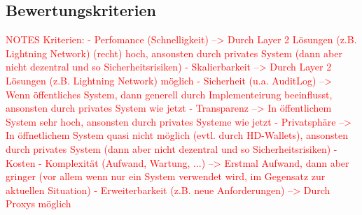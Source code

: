 \noindent

\subsection{Bewertungskriterien}

\begin{flushleft}

    \textcolor{red}{NOTES Kriterien: \break
    - Perfomance (Schnelligkeit) --> Durch Layer 2 Lösungen (z.B. Lightning Network) (recht) hoch, ansonsten durch privates System (dann aber nicht dezentral und so Sicherheitsrisiken)\break
    - Skalierbarkeit --> Durch Layer 2 Lösungen (z.B. Lightning Network) möglich\break
    - Sicherheit (u.a. AuditLog) --> Wenn öffentliches System, dann generell durch Implementeirung beeinflusst, ansonsten durch privates System wie jetzt\break
    - Transparenz --> In öffentlichem System sehr hoch, ansonsten durch privates Systeme wie jetzt\break
    - Privatsphäre --> In öffnetlichem System quasi nicht möglich (evtl. durch HD-Wallets), ansonsten durch privates System (dann aber nicht dezentral und so Sicherheitsrisiken)\break
    - Kosten \break
    - Komplexität (Aufwand, Wartung, ...) --> Erstmal Aufwand, dann aber gringer (vor allem wenn nur ein System verwendet wird, im Gegensatz zur aktuellen Situation)\break
    - Erweiterbarkeit (z.B. neue Anforderungen) --> Durch Proxys möglich}
\end{flushleft}